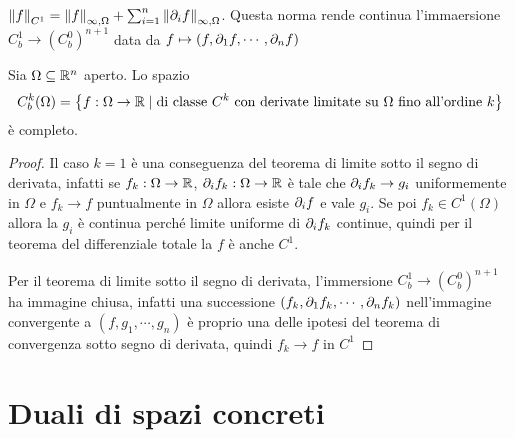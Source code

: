 $\left\Vert{f}\right\Vert_{C^1}=\left\Vert{f}\right\Vert_{\infty,\Omega}+\sum_{i=1}^n\left\Vert{\partial_i f}\right\Vert_{\infty,\Omega}$. Questa norma rende continua l'immaersione $C^1_b\to (C_b^0)^{n+1}$ data da $f\mapsto(f,\partial_1f,\cdots,\partial_n f)$

\begin{proposition}
Sia $\Omega\subseteq \mathbb{R}^n$ aperto. Lo spazio 
\[C^k_b(\Omega)=\left\{{f:\Omega\to\mathbb{R}\mid \text{di classe $C^k$ con derivate limitate su $\Omega$ fino all'ordine $k$}}\right\}\]
\`e completo.
\end{proposition}
\begin{proof}
Il caso $k=1$ \`e una conseguenza del teorema di limite sotto il segno di derivata, infatti se $f_k:\Omega\to \mathbb{R}$, $\partial_i f_k:\Omega\to\mathbb{R}$ \`e tale che $\partial_i f_k\to g_i$ uniformemente in $\Omega$ e $f_k\to f$ puntualmente in $\Omega$ allora esiste $\partial_i f$ e vale $g_i$. Se poi $f_k\in C^1(\Omega)$ allora la $g_i$ \`e continua perch\'e limite uniforme di $\partial_i f_k$ continue, quindi per il teorema del differenziale totale la $f$ \`e anche $C^1$.

Per il teorema di limite sotto il segno di derivata, l'immersione $C^1_b\to (C_b^0)^{n+1}$ ha immagine chiusa, infatti una successione $(f_k,\partial_1f_k,\cdots,\partial_nf_k)$ nell'immagine convergente a $(f,g_1,\cdots, g_n)$ \`e proprio una delle ipotesi del teorema di convergenza sotto segno di derivata, quindi $f_k\to f$ in $C^1$
\end{proof}

\section{Duali di spazi concreti}
